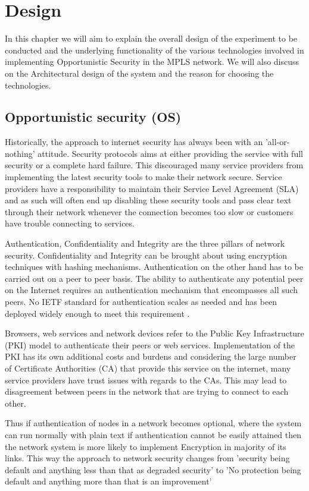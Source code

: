 \chapter{Design}
In this chapter we will aim to explain the overall design of the experiment to be conducted and the underlying functionality of the various technologies involved in implementing Opportunistic Security in the MPLS network. We will also discuss on the Architectural design of the system and the reason for choosing the technologies.

\section{Opportunistic security (OS)}
Historically, the approach to internet security has always been with an 'all-or-nothing' attitude. Security protocols aims at either providing the service with full security or a complete hard failure. This discouraged many service providers from implementing the latest security tools to make their network secure. Service providers have a responsibility to maintain their Service Level Agreement (SLA) and as such will often end up disabling these security tools and pass clear text through their network whenever the connection becomes too slow or customers have trouble connecting to services.

Authentication, Confidentiality and Integrity are the three pillars of network security. Confidentiality and Integrity can be brought about using encryption techniques with hashing mechanisms. Authentication on the other hand has to be carried out on a peer to peer basis. The ability to authenticate any potential peer on the Internet requires an authentication mechanism that encompasses all such peers. No IETF standard for authentication scales as needed and has been deployed widely enough to meet this requirement \cite{rfc7435}.

Browsers, web services and network devices refer to the Public Key Infrastructure (PKI) model to authenticate their peers or web services. Implementation of the PKI has its own additional costs and burdens and considering the large number of Certificate Authorities (CA) that provide this service on the internet, many service providers have trust issues with regards to the CAs. This may lead to disagreement between peers in the network that are trying to connect to each other.

Thus if authentication of nodes in a network becomes optional, where the system can run normally with plain text if authentication cannot be easily attained then the network system is more likely to implement Encryption in majority of its links. This way the approach to network security changes from 'security being default and anything less than that as degraded security' to 'No protection being default and anything more than that is an improvement'

